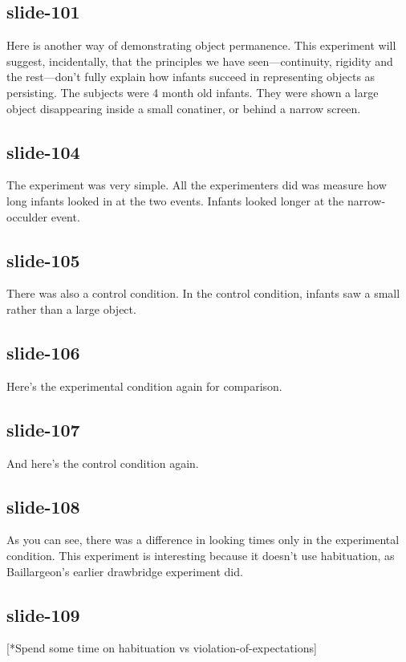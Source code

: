 \documentclass[12pt,\papersize]{extarticle}
\begin{document}
 
\subsection{slide-101}
Here is another way of demonstrating object permanence.
This experiment will suggest, incidentally, that the principles we have seen---continuity, rigidity and the rest---don't fully explain how infants succeed in representing objects as persisting.
The subjects were 4 month old infants.
They were shown a large object disappearing inside a small conatiner, or behind a narrow screen.
 
 
\subsection{slide-104}
The experiment was very simple.
All the experimenters did was measure how long infants looked in at the two events.
Infants looked longer at the narrow-occulder event.
 
 
\subsection{slide-105}
There was also a control condition.
In the control condition, infants saw a small rather than a large object.
 
 
\subsection{slide-106}
Here’s the experimental condition again for comparison.
 
 
\subsection{slide-107}
And here's the control condition again.
 
 
\subsection{slide-108}
As you can see, there was a difference in looking times only in the experimental condition.
This experiment is interesting because it doesn't use habituation, as Baillargeon's earlier drawbridge experiment did.
 
 
\subsection{slide-109}
[*Spend some time on habituation vs violation-of-expectations]
 
\end{document}
